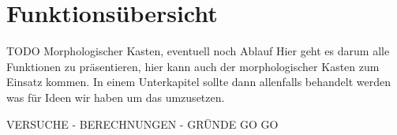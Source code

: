 \section{Funktionsübersicht}
TODO Morphologischer Kasten, eventuell noch Ablauf Hier geht es darum alle Funktionen zu präsentieren, hier kann auch der morphologischer Kasten zum Einsatz kommen.
In einem Unterkapitel sollte dann allenfalls behandelt werden was für Ideen wir haben um das umzusetzen.

VERSUCHE - BERECHNUNGEN - GRÜNDE GO GO























